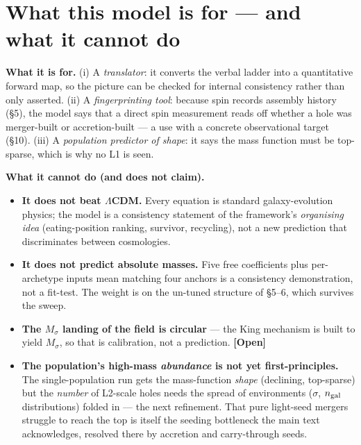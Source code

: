 \documentclass[11pt]{article}
\newcommand{\Open}{\textbf{\textcolor{gray!10!black}{[Open]}}}
\newcommand{\Msig}{M_\sigma}
\begin{document}
\section{What this model is for --- and what it cannot do}
\textbf{What it is for.} (i) A \emph{translator}: it converts the verbal ladder into a quantitative forward map, so the picture can be checked for internal consistency rather than only asserted. (ii) A \emph{fingerprinting tool}: because spin records assembly history (\S5), the model says that a direct spin measurement reads off whether a hole was merger-built or accretion-built --- a use with a concrete observational target (\S10). (iii) A \emph{population predictor of shape}: it says the mass function must be top-sparse, which is why no L1 is seen.

\textbf{What it cannot do (and does not claim).}
\begin{itemize}[leftmargin=1.3em,itemsep=2pt]
\item \textbf{It does not beat $\Lambda$CDM.} Every equation is standard galaxy-evolution physics; the model is a consistency statement of the framework's \emph{organising idea} (eating-position ranking, survivor, recycling), not a new prediction that discriminates between cosmologies.
\item \textbf{It does not predict absolute masses.} Five free coefficients plus per-archetype inputs mean matching four anchors is a consistency demonstration, not a fit-test. The weight is on the un-tuned structure of \S5--6, which survives the sweep.
\item \textbf{The $\Msig$ landing of the field is circular} --- the King mechanism is built to yield $\Msig$, so that is calibration, not a prediction. \Open
\item \textbf{The population's high-mass \emph{abundance} is not yet first-principles.} The single-population run gets the mass-function \emph{shape} (declining, top-sparse) but the \emph{number} of L2-scale holes needs the spread of environments ($\sigma$, $n_{\rm gal}$ distributions) folded in --- the next refinement. That pure light-seed mergers struggle to reach the top is itself the seeding bottleneck the main text acknowledges, resolved there by accretion and carry-through seeds.
\end{itemize}

\end{document}
